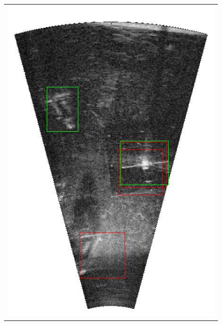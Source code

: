 \begin{figure}[!p]
{\begin{tabular}[b]{c}
		\includegraphics[height=0.2\textheight]{chapters/images/proposals/errors/fcn-2016-02-11_035335-frame11651-proposals.jpg}\\

\end{tabular}}
\end{figure}
